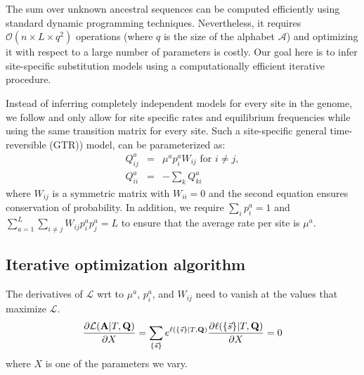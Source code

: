 \documentclass[aps,rmp,twocolumn]{revtex4}
\newcommand{\mat}[1]{{\bf #1}}
\newcommand{\abet}{\mathcal{A}}
\newcommand{\eqp}{p}
\newcommand{\LH}{\mathcal{L}}
\newcommand{\lh}{\ell}
\begin{document}
The sum over unknown ancestral sequences can be computed efficiently using standard dynamic programming techniques.
Nevertheless, it requires $\mathcal{O}(n\times L \times q^2)$ operations (where $q$ is the size of the alphabet $\abet$) and optimizing it with respect to a large number of parameters is costly.
Our goal here is to infer site-specific substitution models using a computationally efficient iterative procedure.

Instead of inferring completely independent models for every site in the genome, we follow \citet{halpern_evolutionary_1998} and only allow for site specific rates and equilibrium frequencies while using the same transition matrix for every site.
Such a site-specific general time-reversible (GTR)) model, can be parameterized as:
\begin{eqnarray}
Q^{a}_{ij} &=& \mu^{a}\eqp^{a}_{i} W_{ij} \textrm{ for } i\neq j,\nonumber \\
Q^{a}_{ii} &=& -\sum_k Q^{a}_{ki}
\label{eq:Qij}
\end{eqnarray}
where $W_{ij}$ is a symmetric matrix with $W_{ii}=0$ and the second equation ensures conservation of probability.
In addition, we require $\sum_i \eqp^{a}_i = 1$ and $\sum_{a=1}^L\sum_{i\neq j}W_{ij}p^{a}_ip^{a}_j=L$ to ensure that the average rate per site is $\mu^{a}$.


\subsection*{Iterative optimization algorithm}
The derivatives of $\LH$ wrt to $\mu^a$, $\eqp_i^a$, and $W_{ij}$ need to vanish at the values that maximize $\LH$.
\begin{equation}
	\frac{\partial \LH(\mat{A}|T,\mat{Q})}{\partial X} = \sum_{\{\vec{s}\}} e^{\lh(\{\vec{s}\} |T, \mat{Q})} \frac{\partial \ell(\{\vec{s}\}|T,\mat{Q})}{\partial X} = 0
\end{equation}
where $X$ is one of the parameters we vary.
\end{document}
